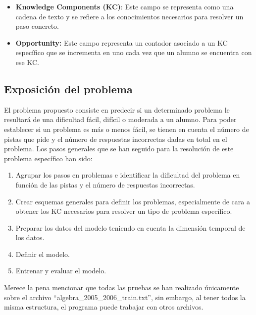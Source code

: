 \documentclass[acmtog, screen]{acmart}
\begin{document}
\begin{itemize}
	\item \textbf{Knowledge Components (KC)}: Este campo se representa como una cadena de texto y se refiere a los conocimientos necesarios para resolver un paso concreto.
	\item \textbf{Opportunity:} Este campo representa un contador asociado a un KC específico que se incrementa en uno cada vez que un alumno se encuentra con ese KC.
\end{itemize}

\subsection{Exposición del problema}
El problema propuesto consiste en predecir si un determinado problema le resultará de una dificultad fácil, difícil o moderada a un alumno. Para poder establecer si un problema es más o menos fácil, se tienen en cuenta el número de pistas que pide y el número de respuestas incorrectas dadas en total en el problema. Los pasos generales que se han seguido para la resolución de este problema específico han sido:
\begin{enumerate}
	\item Agrupar los pasos en problemas e identificar la dificultad del problema en función de las pistas y el número de respuestas incorrectas.
	\item Crear esquemas generales para definir los problemas, especialmente de cara a obtener los KC necesarios para resolver un tipo de problema específico.
	\item Preparar los datos del modelo teniendo en cuenta la dimensión temporal de los datos.
	\item Definir el modelo.
	\item Entrenar y evaluar el modelo.
\end{enumerate}
Merece la pena mencionar que todas las pruebas se han realizado únicamente sobre el archivo ``algebra\_2005\_2006\_train.txt'', sin embargo, al tener todos la misma estructura, el programa puede trabajar con otros archivos.
\end{document}
